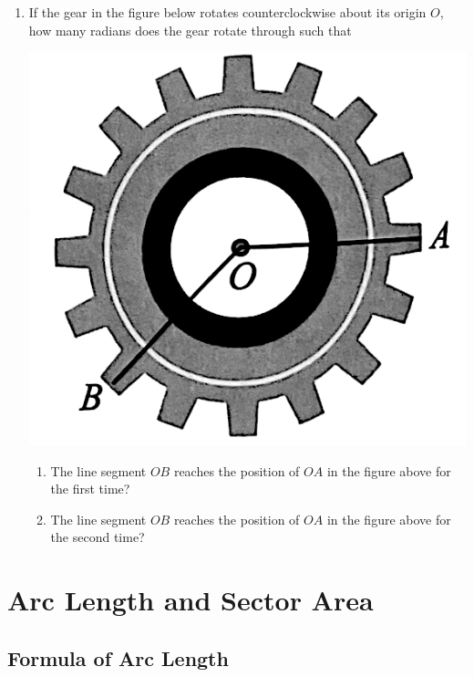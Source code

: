 \documentclass{report}
\begin{document}
\begin{enumerate}
	\item If the gear in the figure below rotates counterclockwise about its origin $O$, how many radians does the gear rotate through such that
	      \begin{center}
	      	\includegraphics[scale=0.2]{assets/8-5.png}
	      \end{center}
	      \begin{enumerate}
	      	\item The line segment $OB$ reaches the position of $OA$ in the figure above for the first time?
	      	\item The line segment $OB$ reaches the position of $OA$ in the figure above for the second time?
	      \end{enumerate}
\end{enumerate}

\newpage
\section{Arc Length and Sector Area}

\subsection*{Formula of Arc Length}
\end{document}
